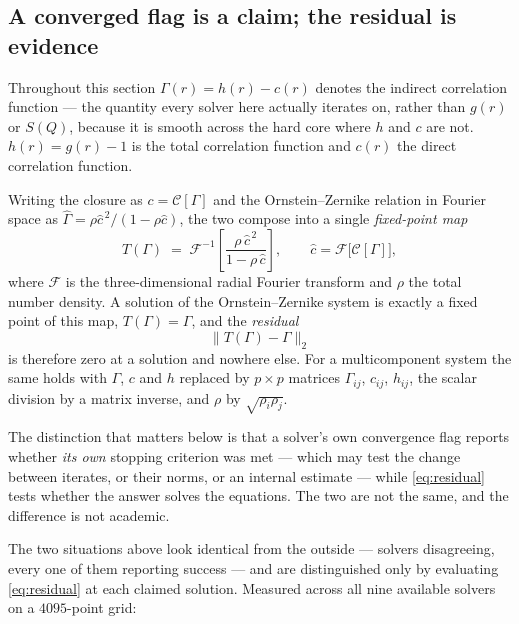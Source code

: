 \documentclass[11pt,a4paper]{article}
\begin{document}
\subsection{A converged flag is a claim; the residual is evidence}

Throughout this section $\Gamma(r) = h(r) - c(r)$ denotes the indirect
correlation function --- the quantity every solver here actually iterates on,
rather than $g(r)$ or $S(Q)$, because it is smooth across the hard core where
$h$ and $c$ are not. $h(r) = g(r) - 1$ is the total correlation function and
$c(r)$ the direct correlation function.

Writing the closure as $c = \mathcal{C}[\Gamma]$ and the Ornstein--Zernike
relation in Fourier space as $\hat\Gamma = \rho\hat c^{\,2}/(1 - \rho\hat c)$,
the two compose into a single \emph{fixed-point map}
\begin{equation}
 T(\Gamma) \;=\; \mathcal{F}^{-1}\!\left[
   \frac{\rho\,\hat c^{\,2}}{1 - \rho\,\hat c}\right],
 \qquad \hat c = \mathcal{F}\big[\mathcal{C}[\Gamma]\big],
 \label{eq:fixedpointmap}
\end{equation}
where $\mathcal{F}$ is the three-dimensional radial Fourier transform and
$\rho$ the total number density. A solution of the Ornstein--Zernike system
is exactly a fixed point of this map, $T(\Gamma) = \Gamma$, and the
\emph{residual}
\begin{equation}
 \|T(\Gamma) - \Gamma\|_2
 \label{eq:residual}
\end{equation}
is therefore zero at a solution and nowhere else. For a multicomponent system
the same holds with $\Gamma$, $c$ and $h$ replaced by $p\times p$ matrices
$\Gamma_{ij}$, $c_{ij}$, $h_{ij}$, the scalar division by a matrix inverse,
and $\rho$ by $\sqrt{\rho_i\rho_j}$.

The distinction that matters below is that a solver's own convergence flag
reports whether \emph{its own} stopping criterion was met --- which may test
the change between iterates, or their norms, or an internal estimate --- while
\eqref{eq:residual} tests whether the answer solves the equations. The two
are not the same, and the difference is not academic.

The two situations above look identical from the outside --- solvers
disagreeing, every one of them reporting success --- and are distinguished
only by evaluating \eqref{eq:residual} at each claimed solution. Measured
across all nine available solvers on a $4095$-point grid:
\end{document}
